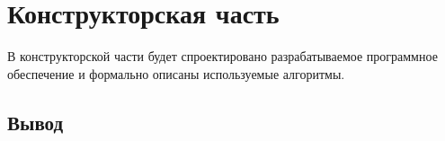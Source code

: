 \chapter{Конструкторская часть}
В конструкторской части будет спроектировано разрабатываемое программное обеспечение и формально описаны используемые алгоритмы.



\section*{Вывод}
